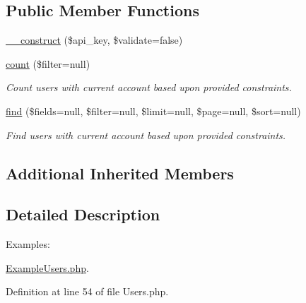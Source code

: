\subsection*{Public Member Functions}
\begin{DoxyCompactItemize}
\item 
\hyperlink{classTune_1_1Management_1_1Api_1_1Account_1_1Users_aab63a7d580ddd0c159012d5a58a2f11d}{\-\_\-\-\_\-construct} (\$api\-\_\-key, \$validate=false)
\item 
\hyperlink{classTune_1_1Management_1_1Api_1_1Account_1_1Users_ae6a4659b5a7c92cf892184cf6050fb61}{count} (\$filter=null)
\begin{DoxyCompactList}\small\item\em Count users with current account based upon provided constraints. \end{DoxyCompactList}\item 
\hyperlink{classTune_1_1Management_1_1Api_1_1Account_1_1Users_a446332cba1c724bbd2fbbb4be3a89f24}{find} (\$fields=null, \$filter=null, \$limit=null, \$page=null, \$sort=null)
\begin{DoxyCompactList}\small\item\em Find users with current account based upon provided constraints. \end{DoxyCompactList}\end{DoxyCompactItemize}
\subsection*{Additional Inherited Members}


\subsection{Detailed Description}
\begin{Desc}
\item[Examples\-: ]\par
\hyperlink{ExampleUsers_8php-example}{Example\-Users.\-php}.\end{Desc}


Definition at line 54 of file Users.\-php.



